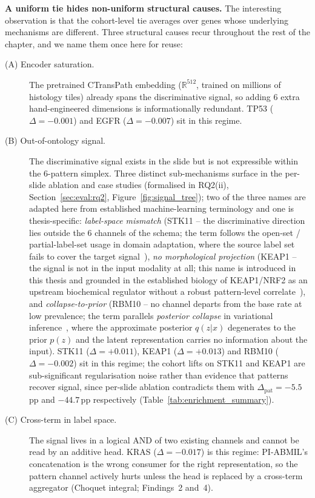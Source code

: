 \textbf{A uniform tie hides non-uniform structural causes.}
The interesting observation is that the cohort-level tie averages
over genes whose underlying mechanisms are different.
Three structural causes recur throughout the rest of the chapter,
and we name them once here for reuse:
\begin{description}
  \item[(A) Encoder saturation.] The pretrained CTransPath
  embedding ($\mathbb{R}^{512}$, trained on millions of histology
  tiles) already spans the discriminative signal, so adding 6 extra
  hand-engineered dimensions is informationally redundant.
  TP53 ($\Delta = -0.001$) and EGFR ($\Delta = -0.007$) sit in
  this regime.
  \item[(B) Out-of-ontology signal.] The discriminative signal
  exists in the slide but is not expressible within the 6-pattern
  simplex.
  Three distinct sub-mechanisms surface in the per-slide ablation
  and case studies (formalised in
  RQ2(ii), Section~\ref{sec:eval:rq2},
  Figure~\ref{fig:signal_tree}); two of the three names are
  adapted here from established machine-learning terminology and
  one is thesis-specific:
  \emph{label-space mismatch} (STK11 -- the discriminative
  direction lies outside the 6 channels of the schema; the term
  follows the open-set / partial-label-set usage in domain
  adaptation, where the source label set fails to cover the
  target signal~\cite{lipton2018labelshift}),
  \emph{no morphological projection} (KEAP1 -- the signal is not
  in the input modality at all; this name is introduced in this
  thesis and grounded in the established biology of
  KEAP1/NRF2 as an upstream biochemical regulator without a
  robust pattern-level
  correlate~\cite{li2011keap1papillary,tcga2014luad}), and
  \emph{collapse-to-prior} (RBM10 -- no channel departs from the
  base rate at low prevalence; the term parallels
  \emph{posterior collapse} in variational
  inference~\cite{bowman2016posteriorcollapse}, where the
  approximate posterior $q(z|x)$ degenerates to the prior $p(z)$
  and the latent representation carries no information about the
  input).
  STK11 ($\Delta = +0.011$), KEAP1 ($\Delta = +0.013$) and RBM10
  ($\Delta = -0.002$) sit in this regime;
  the cohort lifts on STK11 and KEAP1 are sub-significant
  regularisation noise rather than evidence that patterns recover
  signal, since per-slide ablation contradicts them with
  $\Delta_{\mathrm{pat}} = -5.5$\,pp and $-44.7$\,pp respectively
  (Table~\ref{tab:enrichment_summary}).
  \item[(C) Cross-term in label space.] The signal lives in a
  logical AND of two existing channels and cannot be read by an
  additive head.
  KRAS ($\Delta = -0.017$) is this regime: PI-ABMIL's concatenation
  is the wrong consumer for the right representation, so the pattern
  channel actively hurts unless the head is replaced by a cross-term
  aggregator (Choquet integral; Findings~2 and~4).
\end{description}
